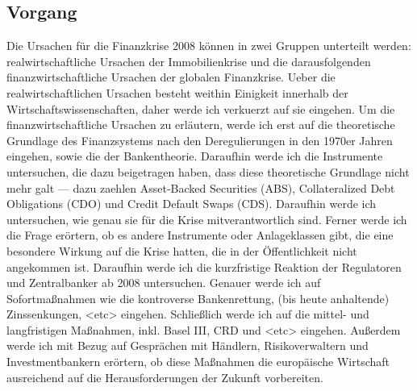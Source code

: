 \documentclass[a4paper,draft]{report}
\begin{document}
\subsection{Vorgang}
Die Ursachen für die Finanzkrise 2008 können 
in zwei Gruppen unterteilt werden: realwirtschaftliche
Ursachen der Immobilienkrise und die darausfolgenden
finanzwirtschaftliche Ursachen der globalen Finanzkrise.
Ueber die realwirtschaftlichen Ursachen besteht weithin
Einigkeit innerhalb der Wirtschaftswissenschaften, daher
werde ich verkuerzt auf sie eingehen.
Um die finanzwirtschaftliche Ursachen zu erläutern, werde
ich erst auf die theoretische Grundlage des Finanzsystems
nach den Deregulierungen in den 1970er Jahren eingehen,
sowie die der Bankentheorie. Daraufhin werde ich die Instrumente
untersuchen, die dazu beigetragen haben, dass diese theoretische Grundlage
nicht mehr galt --- dazu zaehlen Asset-Backed Securities (ABS),
Collateralized Debt Obligations (CDO) und
Credit Default Swaps (CDS). Daraufhin werde
ich untersuchen, wie genau sie für die
Krise mitverantwortlich sind. Ferner werde ich
die Frage erörtern, ob es andere Instrumente
oder Anlageklassen gibt, die eine
besondere Wirkung auf die Krise hatten, die in
der Öffentlichkeit nicht angekommen ist.
Daraufhin werde ich die kurzfristige Reaktion
der Regulatoren und Zentralbanker ab 2008
untersuchen. Genauer werde ich auf
Sofortmaßnahmen wie die kontroverse
Bankenrettung, (bis heute anhaltende)
Zinssenkungen, <etc> eingehen.
Schließlich werde ich auf die mittel- und
langfristigen Maßnahmen, inkl. Basel
III, CRD und <etc> eingehen. Außerdem
werde ich mit Bezug auf Gesprächen mit
Händlern, Risikoverwaltern und
Investmentbankern erörtern, ob diese
Maßnahmen die europäische
Wirtschaft ausreichend auf die
Herausforderungen der Zukunft vorbereiten.
\end{document}
